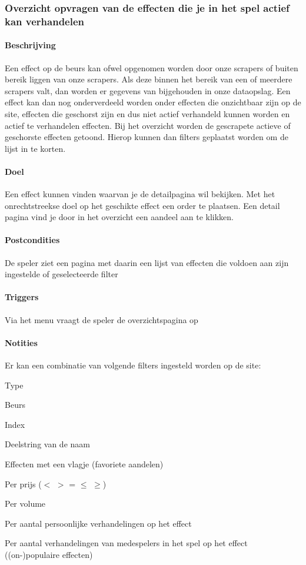 \subsubsection{Overzicht opvragen van de effecten die je in het spel actief kan verhandelen}
\begin{compact}
\paragraph{Beschrijving} Een effect op de beurs kan ofwel opgenomen worden door onze scrapers of buiten bereik liggen van onze scrapers.
Als deze binnen het bereik van een of meerdere scrapers valt, dan worden er gegevens van bijgehouden in onze dataopslag. Een effect kan dan nog onderverdeeld worden onder effecten die onzichtbaar zijn op de site, effecten die geschorst zijn en dus niet actief verhandeld kunnen worden en actief te verhandelen effecten. Bij het overzicht worden de gescrapete actieve of geschorste effecten getoond. Hierop kunnen dan filters geplaatst worden om de lijst in te korten.
\paragraph{Doel} Een effect kunnen vinden waarvan je de detailpagina wil bekijken. Met het onrechtstreekse doel op het geschikte effect een order te plaatsen. Een detail pagina vind je door in het overzicht een aandeel aan te klikken.
\paragraph{Postcondities} De speler ziet een pagina met daarin een lijst van effecten die voldoen aan zijn ingestelde of geselecteerde filter
\paragraph{Triggers} Via het menu vraagt de speler de overzichtspagina op
\paragraph{Notities} Er kan een combinatie van volgende filters ingesteld worden op de site:

\begin{itemize_compact}
	\item Type
	\item Beurs
	\item Index
	\item Deelstring van de naam
	\item Effecten met een vlagje (favoriete aandelen)
	\item Per prijs ($<$ $>$ = $\leq$ $\geq$)
	\item Per volume
	\item Per aantal persoonlijke verhandelingen op het effect
	\item Per aantal verhandelingen van medespelers in het spel op het effect ((on-)populaire effecten)
\end{itemize_compact}


\end{compact}
